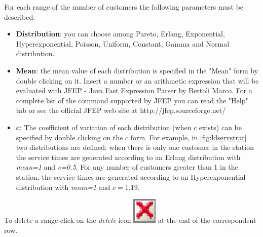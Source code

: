 \begin{itemize}
For each range of the number of customers the following parameters
must be described: \begin{itemize} \item \textbf{Distribution}:
you can choose among Pareto, Erlang, Exponential,
Hyperexponential, Poisson, Uniform, Constant, Gamma and Normal
distribution. \item \textbf{Mean}: the mean value of each
distribution is specified in the "Mean" form by double clicking on
it. Insert a number or an arithmetic expression that will be
evaluated with JFEP - Java Fast Expression Parser by Bertoli
Marco. For a complete list of the command supported by JFEP you
can read the "Help" tab or see the official JFEP web site at
http://jfep.sourceforge.net/ \item \textbf{c}: The coefficient of
variation of each distribution (when $c$ exists) can be specified
by double clicking on the $c$ form. For example, in
\autoref{fig:ldservstrat} two distributions are defined: when there is
only one customer in the station the service times are generated
according to an Erlang distribution with \emph{mean=1} and
\emph{c=0.5}. For any number of customers greater than 1 in the
station, the service times are generated according to an
Hyperexponential distribution with \emph{mean=1} and $c=1.19$.
\end{itemize}
\noindent To delete a range click on the \emph{delete} icon
\includegraphics[scale=.5]{img/jsim/delete.eps}
at the end of the correspondent row.

\end{itemize}

